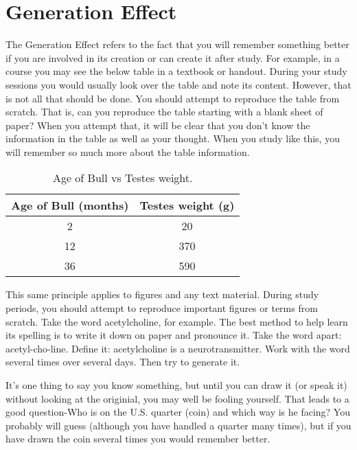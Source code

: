 \chapter{Generation Effect}

The Generation Effect refers to the fact that you will remember something better if you are involved in its creation or can create it after study. For example, in a course you may see the below table in a textbook or handout. During your study sessions you would usually look over the table and note its content. However, that is not all that should be done. You should attempt to reproduce the table from scratch. That is, can you reproduce the table starting with a blank sheet of paper? When you attempt that, it will be clear that you don't know the information in the table as well as your thought. When you study like this, you will remember so much more about the table information. 

\begin{table}[h]
	\begin{center}
		\footnotesize%
		\begin{tabular}{cc}
			\toprule
			Age of Bull (months) & Testes weight (g) \\
			\midrule
			2 & 20 \\
			12 & 370 \\
			36 & 590 \\
			\bottomrule
		\end{tabular}
	\end{center}
	\caption{Age of Bull vs Testes weight.}
	\label{tab:bull}
\end{table}

This same principle applies to figures and any text material. During study periods, you should attempt to reproduce important figures or terms from scratch. Take the word acetylcholine, for example. The best method to help learn its spelling is to write it down on paper and pronounce it. Take the word apart: acetyl-cho-line. Define it: acetylcholine is a neurotransmitter. Work with the word several times over several days. Then try to generate it.

It's one thing to say you know something, but until you can draw it (or speak it) without looking at the originial, you may well be fooling yourself. That leads to a good question-Who is on the U.S. quarter (coin) and which way is he facing? You probably will guess (although you have handled a quarter many times), but if you have drawn the coin several times you would remember better.